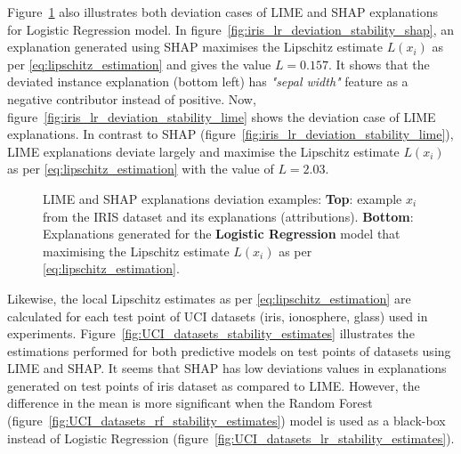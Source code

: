 \documentclass[english]{tktltiki2}
\theoremstyle{definition}
\theoremstyle{remark}
\begin{document}
Figure~\ref{fig:iris_lr_deviation_stability} also illustrates both deviation cases of LIME and SHAP explanations for Logistic Regression model. In figure~\ref{fig:iris_lr_deviation_stability_shap}, an explanation generated using SHAP maximises the Lipschitz estimate $L(x_i)$ as per \eqref{eq:lipschitz_estimation} and gives the value $L=0.157$. It shows that the deviated instance explanation (bottom left) has \textit{"sepal width"} feature as a negative contributor instead of positive. Now, figure~\ref{fig:iris_lr_deviation_stability_lime} shows the deviation case of LIME explanations. In contrast to SHAP (figure~\ref{fig:iris_lr_deviation_stability_lime}), LIME explanations deviate largely and maximise the Lipschitz estimate $L(x_i)$ as per \eqref{eq:lipschitz_estimation} with the value of $L=2.03$. 

\begin{figure}[H]
	\hspace*{\fill}%
	\caption{LIME and SHAP explanations deviation examples: \textbf{Top}: example $x_i$ from the IRIS dataset and its explanations (attributions). \textbf{Bottom}: Explanations generated for the \textbf{Logistic Regression} model that maximising the Lipschitz estimate $L(x_i)$ as per \eqref{eq:lipschitz_estimation}.}%
	\label{fig:iris_lr_deviation_stability}%
\end{figure}



Likewise, the local Lipschitz estimates as per \eqref{eq:lipschitz_estimation} are calculated for each test point of UCI datasets (iris, ionosphere, glass) used in experiments. Figure~\ref{fig:UCI_datasets_stability_estimates} illustrates the estimations performed for both predictive models on test points of datasets using LIME and SHAP. It seems that SHAP has low deviations values in explanations generated on test points of iris dataset as compared to LIME. However, the difference in the mean is more significant when the Random Forest (figure~\ref{fig:UCI_datasets_rf_stability_estimates}) model is used as a black-box instead of Logistic Regression (figure~\ref{fig:UCI_datasets_lr_stability_estimates}).
\end{document}
